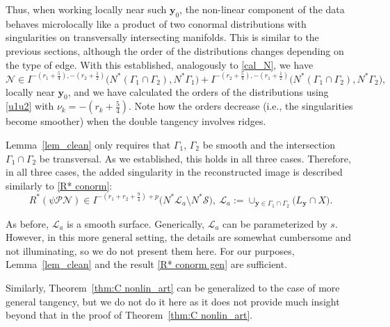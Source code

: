 \documentclass[11pt]{article}
\newcommand{\be}{\begin{equation}}
\newcommand{\ee}{\end{equation}}
\newcommand{\s}{\mathcal S}
\newcommand{\ed}{\tau}
\newcommand{\cC}{\mathcal C}
\newcommand{\CL}{\mathcal L}
\numberwithin{equation}{section}
\newcommand{\vy}{\mathbf{y}}
\newcommand{\vx}{\mathbf{x}}
\theoremstyle{definition}
\begin{document}
Thus, when working locally near such $\vy_0$, the non-linear component of the data behaves microlocally like a product of two conormal distributions with singularities on transversally intersecting manifolds. This is similar to the previous sections, although the order of the distributions changes depending on the type of edge. With this established, analogously to \eqref{cal_N}, we have
\be
\label{cal_N v2}
\mathcal{N}\in I^{-(r_1+\frac54),-(r_2+\frac12)}\big(N^*(\Gamma_1\cap\Gamma_2), N^*\Gamma_1\big) + I^{-(r_2+\frac54),-(r_1+\frac12)}\big(N^*(\Gamma_1\cap\Gamma_2), N^*\Gamma_2\big),
\ee
locally near $\vy_0$, and we have calculated the orders of the distributions using \eqref{u1u2} with $\nu_k=-(r_k+\tfrac54)$. Note how the orders decrease (i.e., the singularities become smoother) when the double tangency involves ridges.

Lemma~\ref{lem_clean} only requires that $\Gamma_1$, $\Gamma_2$ be smooth and the intersection $\Gamma_1\cap\Gamma_2$ be transversal. As we established, this holds in all three cases. Therefore, in all three cases, the added singularity in the reconstructed image is described similarly to \eqref{R* conorm}: 
\be\label{R* conorm gen}
R^* (\psi \mathcal{P}\mathcal{N}) \in I^{-(r_1+r_2+\frac94) + p}\big(N^*\CL_a\setminus N^*\s\big),
\ \CL_a:=\cup_{\vy\in\Gamma_1\cap\Gamma_2}\big(L_{\vy}\cap X\big).
\ee

As before, $\CL_a$ is a smooth surface. Generically, $\CL_a$ can be parameterized by $s$. However, in this more general setting, the details are somewhat cumbersome and not illuminating, so we do not present them here. For our purposes, Lemma~\ref{lem_clean} and the result \eqref{R* conorm gen} are sufficient.

Similarly, Theorem~\ref{thm:C nonlin_art} can be generalized to the case of more general tangency, but we do not do it here as it does not provide much insight beyond that in the proof of Theorem~\ref{thm:C nonlin_art}.   
\end{document}
